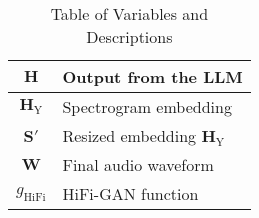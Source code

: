 \begin{table}[H]
{\begin{tabular}{c|l}
        \( \mathbf{H} \) & Output from the LLM  \\ \hline
        \( \mathbf{H}_\text{Y} \) & Spectrogram embedding  \\ \hline
        \( \mathbf{S}' \) & Resized embedding \( \mathbf{H}_\text{Y} \) \\ \hline
        \( \mathbf{W} \) & Final audio waveform \\ \hline
        \( g_\text{HiFi} \) & HiFi-GAN function \\ \hline
    \end{tabular}}
    \label{tab:variables_descriptions}
    \caption{Table of Variables and Descriptions}
\end{table}
